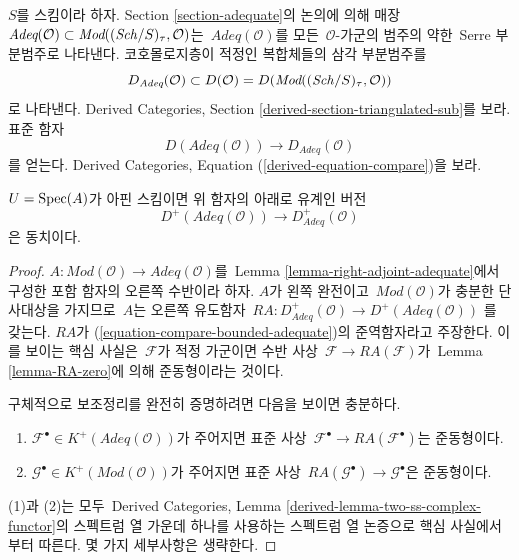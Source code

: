 \noindent
$S$를 스킴이라 하자. Section \ref{section-adequate}의 논의에 의해
매장\ 
$\textit{Adeq}(\mathcal{O}) \subset
\textit{Mod}((\mathit{Sch}/S)_\tau, \mathcal{O})$는\ 
$\textit{Adeq}(\mathcal{O})$를 모든\  $\mathcal{O}$-가군의 범주의
약한\  Serre 부분범주로 나타낸다. 코호몰로지층이 적정인 복합체들의
삼각 부분범주를
$$
D_{\textit{Adeq}}(\mathcal{O}) \subset
D(\mathcal{O}) = D(\textit{Mod}((\mathit{Sch}/S)_\tau, \mathcal{O}))
$$
로 나타낸다. Derived Categories, Section
\ref{derived-section-triangulated-sub}를 보라. 표준 함자
$$
D(\textit{Adeq}(\mathcal{O}))
\longrightarrow
D_{\textit{Adeq}}(\mathcal{O})
$$
를 얻는다. Derived Categories, Equation
(\ref{derived-equation-compare})을 보라.

\begin{lemma}
\label{lemma-bounded-below}
$U = \mathop{\mathrm{Spec}}(A)$가 아핀 스킴이면 위 함자의 아래로 유계인 버전
\begin{equation}
\label{equation-compare-bounded-adequate}
D^+(\textit{Adeq}(\mathcal{O}))
\longrightarrow
D^+_{\textit{Adeq}}(\mathcal{O})
\end{equation}
은 동치이다.
\end{lemma}

\begin{proof}
$A : \textit{Mod}(\mathcal{O}) \to \textit{Adeq}(\mathcal{O})$를\ 
Lemma \ref{lemma-right-adjoint-adequate}에서 구성한 포함 함자의
오른쪽 수반이라 하자. $A$가 왼쪽 완전이고\ 
$\textit{Mod}(\mathcal{O})$가 충분한 단사대상을 가지므로\  $A$는
오른쪽 유도함자\ 
$RA : D^+_{\textit{Adeq}}(\mathcal{O}) \to D^+(\textit{Adeq}(\mathcal{O}))$
를 갖는다. $RA$가 (\ref{equation-compare-bounded-adequate})의
준역함자라고 주장한다. 이를 보이는 핵심 사실은\  $\mathcal{F}$가
적정 가군이면 수반 사상\  $\mathcal{F} \to RA(\mathcal{F})$가\  Lemma
\ref{lemma-RA-zero}에 의해 준동형이라는 것이다.

\medskip\noindent
구체적으로 보조정리를 완전히 증명하려면 다음을 보이면 충분하다.
\begin{enumerate}
\item $\mathcal{F}^\bullet \in K^+(\textit{Adeq}(\mathcal{O}))$가
주어지면 표준 사상\ 
$\mathcal{F}^\bullet \to RA(\mathcal{F}^\bullet)$는 준동형이다.
\item $\mathcal{G}^\bullet \in K^+(\textit{Mod}(\mathcal{O}))$가
주어지면 표준 사상\ 
$RA(\mathcal{G}^\bullet) \to \mathcal{G}^\bullet$은 준동형이다.
\end{enumerate}
(1)과 (2)는 모두\  Derived Categories, Lemma
\ref{derived-lemma-two-ss-complex-functor}의 스펙트럼 열 가운데 하나를
사용하는 스펙트럼 열 논증으로 핵심 사실에서부터 따른다.
몇 가지 세부사항은 생략한다.
\end{proof}

